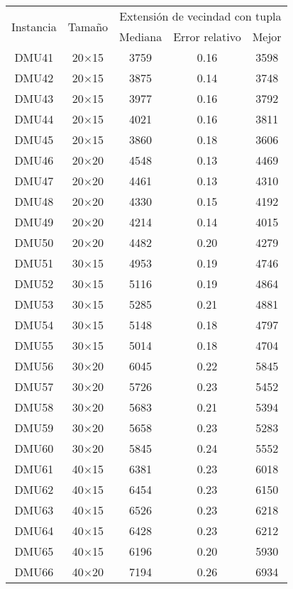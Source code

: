 \begin{table}[H]
\centering
\begin{tabular}{@{}ccccc@{}}
\toprule
\multirow{2}{*}{Instancia} & \multirow{2}{*}{Tamaño} & \multicolumn{3}{c}{Extensión de vecindad con tupla} \\ \cmidrule(lr){3-5}
& & Mediana& Error relativo & Mejor  \\ \midrule
DMU41 & 20$\times$15 & 3759 & 0.16 & 3598\\ 
DMU42 & 20$\times$15 & 3875 & 0.14 & 3748\\ 
DMU43 & 20$\times$15 & 3977 & 0.16 & 3792\\ 
DMU44 & 20$\times$15 & 4021 & 0.16 & 3811\\ 
DMU45 & 20$\times$15 & 3860 & 0.18 & 3606\\ 
DMU46 & 20$\times$20 & 4548 & 0.13 & 4469\\ 
DMU47 & 20$\times$20 & 4461 & 0.13 & 4310\\ 
DMU48 & 20$\times$20 & 4330 & 0.15 & 4192\\ 
DMU49 & 20$\times$20 & 4214 & 0.14 & 4015\\ 
DMU50 & 20$\times$20 & 4482 & 0.20 & 4279\\ 
DMU51 & 30$\times$15 & 4953 & 0.19 & 4746\\ 
DMU52 & 30$\times$15 & 5116 & 0.19 & 4864\\ 
DMU53 & 30$\times$15 & 5285 & 0.21 & 4881\\ 
DMU54 & 30$\times$15 & 5148 & 0.18 & 4797\\ 
DMU55 & 30$\times$15 & 5014 & 0.18 & 4704\\ 
DMU56 & 30$\times$20 & 6045 & 0.22 & 5845\\ 
DMU57 & 30$\times$20 & 5726 & 0.23 & 5452\\ 
DMU58 & 30$\times$20 & 5683 & 0.21 & 5394\\ 
DMU59 & 30$\times$20 & 5658 & 0.23 & 5283\\ 
DMU60 & 30$\times$20 & 5845 & 0.24 & 5552\\ 
DMU61 & 40$\times$15 & 6381 & 0.23 & 6018\\ 
DMU62 & 40$\times$15 & 6454 & 0.23 & 6150\\ 
DMU63 & 40$\times$15 & 6526 & 0.23 & 6218\\ 
DMU64 & 40$\times$15 & 6428 & 0.23 & 6212\\ 
DMU65 & 40$\times$15 & 6196 & 0.20 & 5930\\ 
DMU66 & 40$\times$20 & 7194 & 0.26 & 6934\\ 

\end{tabular}
\end{table}
